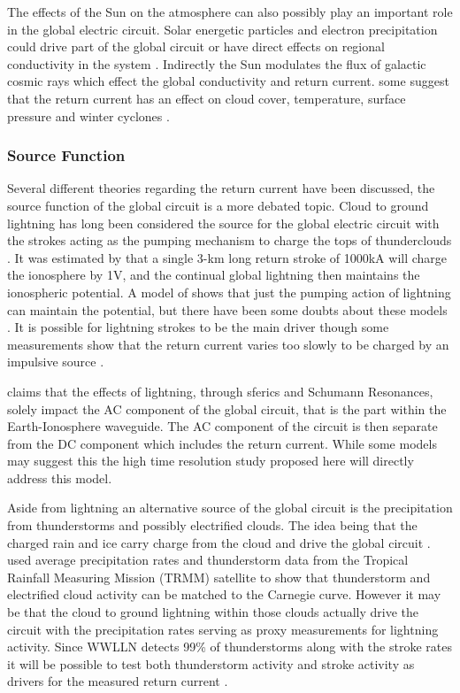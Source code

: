 
The effects of the Sun on the atmosphere can also possibly  play an important role in the global electric circuit.
Solar energetic particles and electron precipitation could drive part of the global circuit or have direct effects on regional conductivity in the system \citep{Tinsley2007}.
Indirectly the Sun modulates the flux of galactic cosmic rays which effect the global conductivity and return current. some suggest that the return current has an effect on cloud cover, temperature, surface pressure and winter cyclones \citep{Kniveton2008,Tinsley2007}.

\subsubsection*{Source Function}

Several different theories regarding the return current have been discussed, the source function of the global circuit is a more debated topic.
Cloud to ground lightning has long been considered the source for the global electric circuit with the strokes acting as the pumping mechanism to charge the tops of thunderclouds \citep{Roble1986}.
It was estimated by \citet{Wait1960} that a single 3-km long return stroke of 1000kA will charge the ionosphere by 1V, and the continual global lightning then maintains the ionospheric potential.
A model of \citet{Anderson1969} shows that just the pumping action of lightning can maintain the potential, but there have been some doubts about these models \citep{Hill1971}.
It is possible for lightning strokes to be the main driver though some measurements show that the return current varies too slowly to be charged by an impulsive source \citep{Krider1982}.

\citet{Rycroft2008} claims that the effects of lightning, through sferics and Schumann Resonances, solely impact the AC component of the global circuit, that is the part within the Earth-Ionosphere waveguide.
The AC component of the circuit is then separate from the DC component which includes the return current.
While some models may suggest this the high time resolution study proposed here will directly address this model.

Aside from lightning an alternative source of the global circuit is the precipitation from thunderstorms and possibly electrified clouds.
The idea being that the charged rain and ice carry charge from the cloud and drive the global circuit \citep{Rycroft2008}.
\citet{Liu2010} used average precipitation rates and thunderstorm data from the Tropical Rainfall Measuring Mission (TRMM) satellite to show that thunderstorm and electrified cloud activity can be matched to the Carnegie curve.
However it may be that the cloud to ground lightning within those clouds actually drive the circuit with the precipitation rates serving as proxy measurements for lightning activity.
Since WWLLN detects 99\% of thunderstorms along with the stroke rates it will be possible to test both thunderstorm activity and stroke activity as drivers for the measured return current \citep{Jacobson2006c}.

